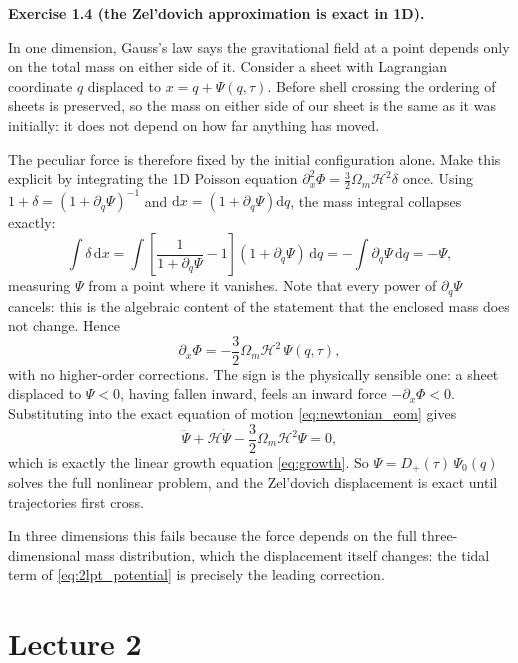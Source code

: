 \documentclass[a4paper,11pt]{article}
\def\cH{\mathcal{H}}
\newcommand{\dd}{\mathrm{d}}
\def\Om{\Omega_m}
\newenvironment{solution}[1]
  {\par\medskip\noindent\textbf{#1}\par\nobreak\smallskip}
  {\par\medskip}
\begin{document}
\begin{solution}{Exercise 1.4 (the Zel'dovich approximation is exact in 1D).}
In one dimension, Gauss's law says the gravitational field at a point depends
only on the total mass on either side of it. Consider a sheet with Lagrangian
coordinate $q$ displaced to $x = q + \Psi(q,\tau)$. Before shell crossing the
ordering of sheets is preserved, so the mass on either side of our sheet is the
same as it was initially: it does not depend on how far anything has moved.

The peculiar force is therefore fixed by the initial configuration alone. Make
this explicit by integrating the 1D Poisson equation
$\partial_x^2\Phi = \tfrac32\Om\cH^2\delta$ once. Using
$1 + \delta = (1 + \partial_q\Psi)^{-1}$ and $\dd x = (1+\partial_q\Psi)\dd q$,
the mass integral collapses exactly:
\begin{equation*}
\int \delta\,\dd x
= \int \left[\frac{1}{1+\partial_q\Psi} - 1\right](1+\partial_q\Psi)\,\dd q
= -\int \partial_q\Psi\,\dd q = -\Psi ,
\end{equation*}
measuring $\Psi$ from a point where it vanishes. Note that every power of
$\partial_q\Psi$ cancels: this is the algebraic content of the statement that the
enclosed mass does not change. Hence
\begin{equation*}
\partial_x\Phi = -\frac{3}{2}\Om\cH^2\,\Psi(q,\tau) ,
\end{equation*}
with no higher-order corrections. The sign is the physically sensible one: a
sheet displaced to $\Psi < 0$, having fallen inward, feels an inward force
$-\partial_x\Phi < 0$. Substituting into the exact equation of motion
\eqref{eq:newtonian_eom} gives
\begin{equation*}
\ddot\Psi + \cH\dot\Psi - \frac{3}{2}\Om\cH^2\Psi = 0 ,
\end{equation*}
which is exactly the linear growth equation \eqref{eq:growth}. So
$\Psi = D_+(\tau)\,\Psi_0(q)$ solves the full nonlinear problem, and the
Zel'dovich displacement is exact until trajectories first cross.

In three dimensions this fails because the force depends on the full
three-dimensional mass distribution, which the displacement itself changes: the
tidal term of \eqref{eq:2lpt_potential} is precisely the leading correction.
\end{solution}

\section*{Lecture 2}
\end{document}
